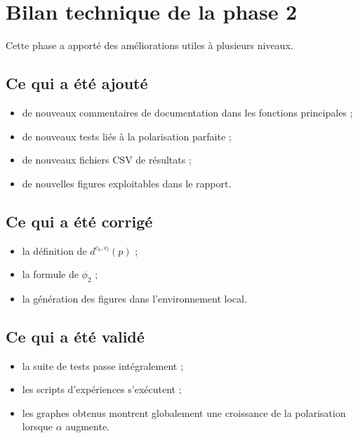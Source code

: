 \documentclass[11pt,a4paper]{article}
\begin{document}
\section{Bilan technique de la phase 2}

Cette phase a apport\'e des am\'eliorations utiles \`a plusieurs niveaux.

\subsection{Ce qui a \'et\'e ajout\'e}

\begin{itemize}[leftmargin=*]
    \item de nouveaux commentaires de documentation dans les fonctions principales ;
    \item de nouveaux tests li\'es \`a la polarisation parfaite ;
    \item de nouveaux fichiers CSV de r\'esultats ;
    \item de nouvelles figures exploitables dans le rapport.
\end{itemize}

\subsection{Ce qui a \'et\'e corrig\'e}

\begin{itemize}[leftmargin=*]
    \item la d\'efinition de \(d^{c_k,c_l}(p)\) ;
    \item la formule de \(\phi_2\) ;
    \item la g\'en\'eration des figures dans l'environnement local.
\end{itemize}

\subsection{Ce qui a \'et\'e valid\'e}

\begin{itemize}[leftmargin=*]
    \item la suite de tests passe int\'egralement ;
    \item les scripts d'exp\'eriences s'ex\'ecutent ;
    \item les graphes obtenus montrent globalement une croissance de la polarisation lorsque \(\alpha\) augmente.
\end{itemize}
\end{document}
